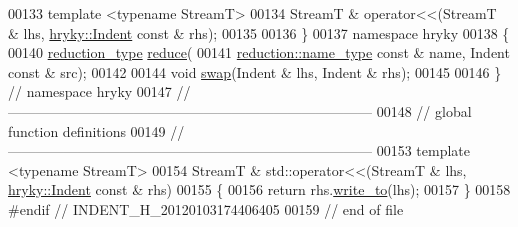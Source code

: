 \begin{DoxyCode}
00133     \textcolor{keyword}{template} <\textcolor{keyword}{typename} StreamT>
00134     StreamT & operator<<(StreamT & lhs, \hyperlink{classhryky_1_1_indent}{hryky::Indent} \textcolor{keyword}{const} & rhs);
00135 
00136 \}
00137 \textcolor{keyword}{namespace }hryky
00138 \{
00140     \hyperlink{namespacehryky_a343a9a4c36a586be5c2693156200eadc}{reduction_type} \hyperlink{namespacehryky_af41cb3af6766761da0ff21b84527a52c}{reduce}(
00141         \hyperlink{namespacehryky_1_1reduction_ac686c30a4c8d196bbd0f05629a6b921f}{reduction::name_type} \textcolor{keyword}{const} & name, Indent \textcolor{keyword}{const} & src);
00142 
00144     \textcolor{keywordtype}{void} \hyperlink{namespacehryky_a4282146df5ea2b68cb667896a2205909}{swap}(Indent & lhs, Indent & rhs);
00145 
00146 \} \textcolor{comment}{// namespace hryky}
00147 \textcolor{comment}{//
      ------------------------------------------------------------------------------}
00148 \textcolor{comment}{// global function definitions}
00149 \textcolor{comment}{//
      ------------------------------------------------------------------------------}
00153 \textcolor{comment}{}\textcolor{keyword}{template} <\textcolor{keyword}{typename} StreamT>
00154 StreamT & std::operator<<(StreamT & lhs, \hyperlink{classhryky_1_1_indent}{hryky::Indent} \textcolor{keyword}{const} & rhs)
00155 \{
00156     \textcolor{keywordflow}{return} rhs.\hyperlink{classhryky_1_1_indent_a3dcdc6227cdbfa80da9791c243c24818}{write_to}(lhs);
00157 \}
00158 \textcolor{preprocessor}{#endif // INDENT\_H\_20120103174406405}
00159 \textcolor{preprocessor}{}\textcolor{comment}{// end of file}
\end{DoxyCode}
